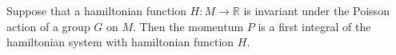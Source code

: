 Suppose that a hamiltonian function $H: M \rightarrow \mathbb{R}$ is invariant under the Poisson action of a group $G$ on $M$. Then the momentum $P$ is a first integral of the hamiltonian system with hamiltonian function $H$.
